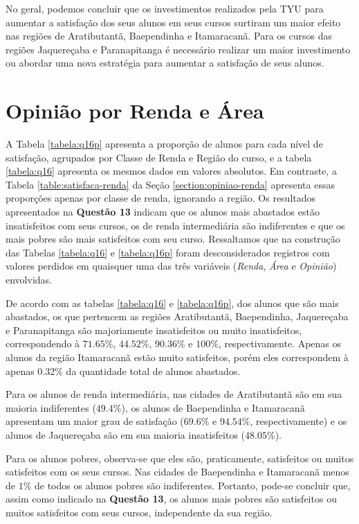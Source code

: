 \documentclass[10pt,a4paper,oneside]{article}
\newcommand{\arat}{Aratibutantã\xspace}
\newcommand{\baep}{Baependinha\xspace}
\newcommand{\itam}{Itamaracanã\xspace}
\newcommand{\jaqu}{Jaquereçaba\xspace}
\newcommand{\para}{Paranapitanga\xspace}
\begin{document}
No geral, podemos concluir que os investimentos realizados pela TYU para aumentar a satisfação dos seus alunos em seus cursos surtiram um maior efeito nas regiões de \arat, \baep e \itam. Para os cursos das regiões \jaqu e \para é necessário realizar um maior investimento ou abordar uma nova estratégia para aumentar a satisfação de seus alunos.

\FloatBarrier
\section{Opinião por Renda e Área}
\label{section:opiniao-renda-area}

A Tabela \ref{tabela:q16p} apresenta a proporção de alunos para cada nível de satisfação, agrupados por Classe de Renda e Região do curso, e a tabela \ref{tabela:q16} apresenta os mesmos dados em valores absolutos. Em contraste, a Tabela \ref{table:satisfaca-renda} da Seção \ref{section:opiniao-renda} apresenta essas proporções apenas por classe de renda, ignorando a região. Os resultados apresentados na \textbf{Questão 13} indicam que os alunos mais abastados estão insatisfeitos com seus cursos, os de renda intermediária são indiferentes e que os mais pobres são mais satisfeitos com seu curso. Ressaltamos que na construção das Tabelas \ref{tabela:q16} e \ref{tabela:q16p} foram desconsiderados registros com valores perdidos em quaisquer uma das três variáveis (\textit{Renda}, \textit{Área} e \textit{Opinião}) envolvidas. 




De acordo com as tabelas \ref{tabela:q16} e \ref{tabela:q16p}, dos alunos que são mais abastados, os que pertencem as regiões \arat, \baep, \jaqu e \para são majoriamente insatisfeitos ou muito insatisfeitos, correspondendo à $71.65\%$, $44.52\%$, $90.36\%$ e $100\%$, respectivamente. Apenas os alunos da região \itam estão muito satisfeitos, porém eles correspondem à apenas $0.32\%$ da quantidade total de alunos abastados.

Para os alunos de renda intermediária, nas cidades de \arat são em sua maioria indiferentes ($49.4\%$), os alunos de \baep e \itam apresentam um maior grau de satisfação ($69.6\%$ e $94.54\%$, respectivamente) e os alunos de \jaqu são em sua maioria insatisfeitos ($48.05\%$).

Para os alunos pobres, observa-se que eles são, praticamente, satisfeitos ou muitos satisfeitos com os seus cursos. Nas cidades de \baep e \itam menos de $1\%$ de todos os alunos pobres são indiferentes. Portanto, pode-se concluir que, assim como indicado na \textbf{Questão 13}, os alunos mais pobres são satisfeitos ou muitos satisfeitos com seus cursos, independente da sua região. 
\end{document}
